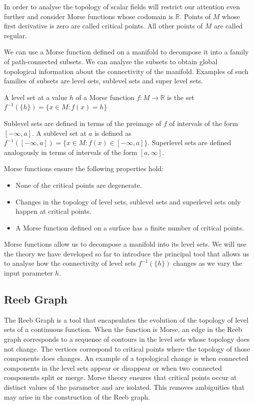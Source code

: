 In order to analyse the topology of scalar fields will restrict our attention even further and consider Morse functions whose codomain is $\mathbb{R}$. Points of $M$ whose first derivative is zero are called critical points. All other points of $M$ are called regular.

We can use a Morse function defined on a manifold to decompose it into a family of path-connected subsets. We can analyse the subsets to obtain global topological information about the connectivity of the manifold. Examples of such families of subsets are level sets, sublevel sets and super level sets.

\begin{defn} A level set at a value $h$ of a Morse function $f: M \to \mathbb{R}$ is the set $f^{-1}(\{h\}) = \{x \in M: f(x) = h \}$   \end{defn}

Sublevel sets are defined in terms of the preimage of $f$ of intervals of the form $[-\infty, a]$. A sublevel set at $a$ is defined as $f^{-1}([-\infty, a]) = \{x \in M: f(x) \in [-\infty, a] \}$. Superlevel sets are defined analogously in terms of intervals of the form $[a, \infty]$.

Morse functions ensure the following properties hold:

\begin{itemize}
    \item None of the critical points are degenerate.
    \item Changes in the topology of level sets, sublevel sets and superlevel sets only happen at critical points.
    \item A Morse function defined on a surface has a finite number of critical points.
\end{itemize}

Morse functions allow us to decompose a manifold into its level sets. We will use the theory we have developed so far to introduce the principal tool that allows us to analyse how the connectivity of level sets $f^{-1}(\{h\})$ changes as we vary the input parameter $h$.

\subsection{Reeb Graph}

The Reeb Graph is a tool that encapsulates the evolution of the topology of level sets of a continuous function. When the function is Morse, an edge in the Reeb graph corresponds to a sequence of contours in the level sets whose topology does not change. The vertices correspond to critical points where the topology of those components does changes. An example of a topological change is when connected components in the level sets appear or disappear or when two connected components split or merge. Morse theory ensures that critical points occur at distinct values of the parameter and are isolated. This removes ambiguities that may arise in the construction of the Reeb graph.

